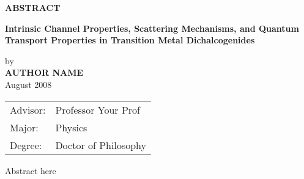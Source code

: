 
\begin{center}
\textbf{ABSTRACT}
	
	
	\singlespacing
\textbf{Intrinsic Channel Properties, Scattering Mechanisms, and Quantum Transport Properties in Transition Metal Dichalcogenides}\\
	\doublespacing
	
	by\\
	
	\textbf{AUTHOR NAME}\\
	August 2008\\
\end{center}
\begin{tabular}{ll}	
Advisor: &Professor Your Prof\\
Major:   &Physics\\
Degree:  &Doctor of Philosophy
\end{tabular}
\bigskip

Abstract here

